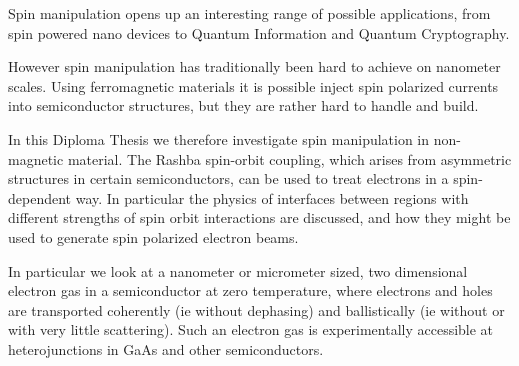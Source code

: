 Spin manipulation opens up an interesting range of possible applications, from
spin powered nano devices to Quantum Information and Quantum Cryptography.

However spin manipulation has traditionally been hard to achieve on nanometer
scales. Using ferromagnetic materials it is possible inject spin polarized
currents into semiconductor structures, but they are rather hard to handle
and build.

In this Diploma Thesis we therefore investigate spin manipulation in
non-magnetic material. The Rashba spin-orbit coupling, which arises from
asymmetric structures in certain semiconductors, can be used to treat
electrons in a spin-dependent way. In particular the physics of interfaces
between regions with different strengths of spin orbit interactions are
discussed, and how they might be used to generate spin polarized electron
beams.

In particular we look at a nanometer or micrometer sized, two dimensional
electron gas in a semiconductor at zero temperature, where electrons and holes
are transported coherently (ie without dephasing) and ballistically (ie
without or with very little scattering). Such an electron gas is
experimentally accessible at heterojunctions in GaAs and other semiconductors.
